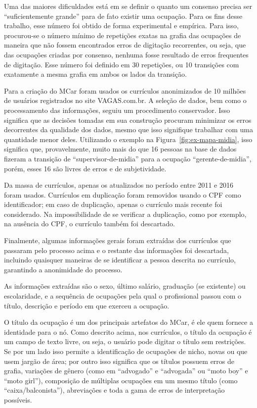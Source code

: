 \documentclass[
  article,
  11pt,
  a4paper,
  english,
  brazil,
  sumario=tradicional]{abntex2}
\begin{document}
Uma das maiores dificuldades está em se definir o quanto um consenso precisa ser \enquote{suficientemente grande} para de fato existir uma ocupação. Para os fins desse trabalho, esse número foi obtido de forma experimental e empírica. Para isso, procurou-se o número mínimo de repetições exatas na grafia das ocupações de maneira que não fossem encontrados erros de digitação recorrentes, ou seja, que das ocupações criadas por consenso, nenhuma fosse resultado de erros frequentes de digitação. Esse número foi definido em 30 repetições, ou 10 transições com exatamente a mesma grafia em ambos os lados da transição.

Para a criação do MCar foram usados os currículos anonimizados de 10 milhões de usuários registrados no site VAGAS.com.br. A seleção de dados, bem como o processamento das informações, seguiu um procedimento conservador. Isso significa que as decisões tomadas em sua construção procuram minimizar os erros decorrentes da qualidade dos dados, mesmo que isso signifique trabalhar com uma quantidade menor deles. Utilizando o exemplo na Figura~\ref{fig:ex-mapa-midia}, isso significa que, provavelmente, muito mais do que 16 pessoas na base de dados fizeram a transição de \enquote{supervisor-de-midia} para a ocupação \enquote{gerente-de-midia}, porém, esses 16 são livres de erros e de subjetividade.

Da massa de currículos, apenas os atualizados no período entre 2011 e 2016 foram usados. Currículos em duplicação foram removidos usando o CPF como identificador; em caso de duplicação, apenas o currículo mais recente foi considerado. Na impossibilidade de se verificar a duplicação, como por exemplo, na ausência do CPF, o currículo também foi descartado.

Finalmente, algumas informações gerais foram extraídas dos currículos que passaram pelo processo acima e o restante das informações foi descartada, incluindo quaisquer maneiras de se identificar a pessoa descrita no currículo, garantindo a anonimidade do processo.

As informações extraídas são o sexo, último salário, graduação (se existente) ou escolaridade, e a sequência de ocupações pela qual o profissional passou com o título, descrição e período em que exerceu a ocupação.

O título da ocupação é um dos principais artefatos do MCar, é ele quem fornece a identidade para o nó. Como descrito acima, nos currículos, o título da ocupação é um campo de texto livre, ou seja, o usuário pode digitar o título sem restrições. Se por um lado isso permite a identificação de ocupações de nicho, novas ou que usem jargão de área; por outro isso significa que os títulos possuem erros de grafia, variações de gênero (como em \enquote{advogado} e \enquote{advogada} ou \enquote{moto boy} e \enquote{moto girl}), composição de múltiplas ocupações em um mesmo título (como \enquote{caixa/balconista}), abreviações e toda a gama de erros de interpretação possíveis.
\end{document}

